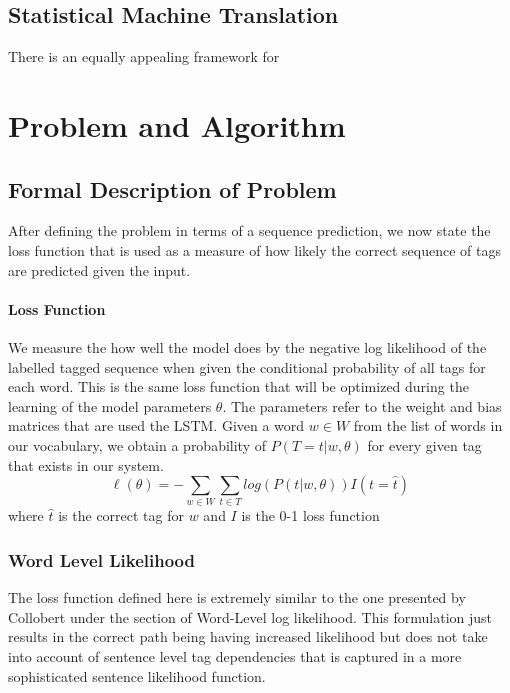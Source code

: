 \documentclass[fyp]{socreport}
\begin{document}
\section{Statistical Machine Translation}
There is an equally appealing framework for


\label{ch:related}


\chapter{Problem and Algorithm}
\section{Formal Description of Problem}
After defining the problem in terms of a sequence prediction, we now state the
loss function that is used as a measure of how likely the correct sequence of
tags are predicted given the input.

\subsubsection{Loss Function} We measure the how well the model does by the negative log likelihood
of the labelled tagged sequence when given the conditional probability of all
tags for each word. This is the same loss function that will be optimized during
the learning of the model parameters $\theta$. The parameters refer to the
weight and bias matrices that are used the LSTM. Given a word $w \in W$ from
the list of words in our vocabulary, we obtain a probability of $P(T=t | w,
\theta)$ for every given tag that exists in our system.
\begin{equation}
  \ell(\theta) = -\sum_{w \in W} \sum_{t \in T} log(P(t | w, \theta)) I(t = \hat{t})
\end{equation}
where $\hat{t}$ is the correct tag for $w$ and $I$ is the 0-1 loss function

\subsection{Word Level Likelihood}

The loss function defined here is extremely similar to the one presented by
Collobert \cite{DBLP2011Collobert} under the section of Word-Level log
likelihood. This formulation just results in the correct path being having
increased likelihood but does not take into account of sentence level tag
dependencies that is captured in a more sophisticated sentence likelihood
function.
\end{document}
